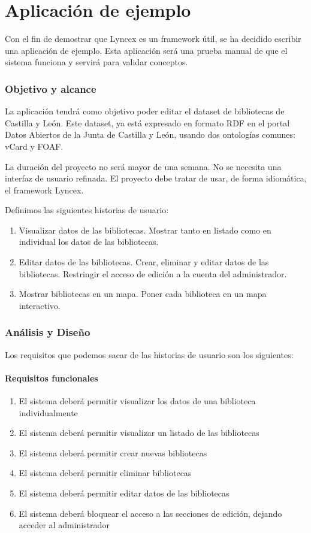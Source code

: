 \documentclass[12pt]{report} %
\begin{document}
\chapter{Aplicación de ejemplo}

Con el fin de demostrar que Lyncex es un framework útil, se ha decidido escribir una aplicación de ejemplo. Esta aplicación será una prueba manual de que el sistema funciona y servirá para validar conceptos.

\subsection{Objetivo y alcance}

La aplicación tendrá como objetivo poder editar el dataset de bibliotecas de Castilla y León. Este dataset, ya está expresado en formato RDF en el portal Datos Abiertos de la Junta de Castilla y León, usando dos ontologías comunes: vCard y FOAF.

La duración del proyecto no será mayor de una semana. No se necesita una interfaz de usuario refinada. El proyecto debe tratar de usar, de forma idiomática, el framework Lyncex.

Definimos las siguientes historias de usuario:
\begin{enumerate}
    \item Visualizar datos de las bibliotecas. Mostrar tanto en listado como en individual los datos de las bibliotecas.
    \item Editar datos de las bibliotecas. Crear, eliminar y editar datos de las bibliotecas. Restringir el acceso de edición a la cuenta del administrador.
    \item Mostrar bibliotecas en un mapa. Poner cada biblioteca en un mapa interactivo.
\end{enumerate}

\subsection{Análisis y Diseño}

Los requisitos que podemos sacar de las historias de usuario son los siguientes:

\subsubsection{Requisitos funcionales}
\begin{enumerate}
    \item El sistema deberá permitir visualizar los datos de una biblioteca individualmente
    \item El sistema deberá permitir visualizar un listado de las bibliotecas
    \item El sistema deberá permitir crear nuevas bibliotecas 
    \item El sistema deberá permitir eliminar bibliotecas
    \item El sistema deberá permitir editar datos de las bibliotecas
    \item El sistema deberá bloquear el acceso a las secciones de edición, dejando acceder al administrador
\end{enumerate}
\end{document}
